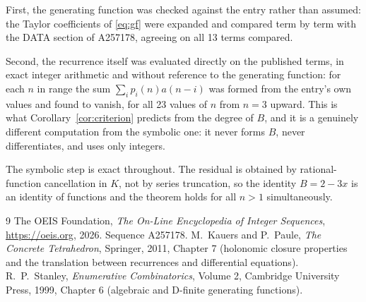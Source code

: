 \documentclass[11pt,a4paper]{article}
\theoremstyle{plain}
\theoremstyle{definition}
\begin{document}
First, the generating function was checked against the entry rather than assumed: the
Taylor coefficients of \eqref{eq:gf} were expanded and compared term by term with the DATA
section of A257178, agreeing on all 13 terms compared.

Second, the recurrence itself was evaluated directly on the published terms, in exact
integer arithmetic and without reference to the generating function: for each $n$ in range
the sum $\sum_{i}p_{i}(n)a(n-i)$ was formed from the entry's own values and found to
vanish, for all 23 values of $n$ from $n=3$ upward. This is what
Corollary~\ref{cor:criterion} predicts from the degree of $B$, and it is a genuinely
different computation from the symbolic one: it never forms $B$, never differentiates, and
uses only integers.

The symbolic step is exact throughout. The residual is obtained by rational-function
cancellation in $K$, not by series truncation, so the identity $B=2 - 3 x$ is an
identity of functions and the theorem holds for all $n>1$ simultaneously.

\begin{thebibliography}{9}
 The OEIS Foundation, \emph{The On-Line Encyclopedia of Integer Sequences},
\url{https://oeis.org}, 2026. Sequence A257178.
 M.~Kauers and P.~Paule, \emph{The Concrete Tetrahedron}, Springer, 2011,
Chapter 7 (holonomic closure properties and the translation between recurrences and
differential equations).
 R.~P.~Stanley, \emph{Enumerative Combinatorics}, Volume 2, Cambridge
University Press, 1999, Chapter 6 (algebraic and D-finite generating functions).
\end{thebibliography}
\end{document}

